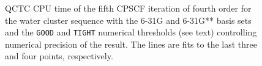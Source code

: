 \documentclass[prl,aps,preprint,showpacs,superbib]{revtex4}
\begin{document}
{\begin{figure}[h]
  \caption{\protect
    QCTC CPU time of the fifth CPSCF iteration of fourth order for
    the water cluster sequence with the 6-31G and 6-31G** 
    basis sets and the {\tt GOOD} and {\tt TIGHT} 
    numerical thresholds (see text) controlling numerical
    precision of the result. The lines are fits to the 
    last three and four points, respectively.
  }\label{fig:Gamma_QCTC_Timing}
\end{figure}

}
\end{document}
